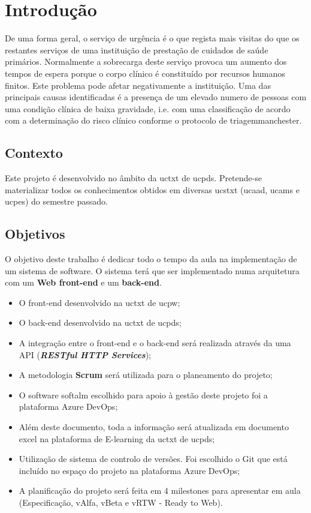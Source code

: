 
\chapter{Introdução}
De uma forma geral, o serviço de urgência é o que regista mais visitas do que os restantes serviços de uma instituição de prestação de cuidados de saúde primários. Normalmente a sobrecarga deste serviço provoca um aumento dos tempos de espera porque o corpo clínico é constituído por recursos humanos finitos. Este problema pode afetar negativamente a instituição. Uma das principais causas identificadas é a presença de um elevado numero de pessoas com uma condição clínica de baixa gravidade, i.e. com uma classificação de acordo com a determinação do risco clínico conforme o protocolo de \gls{triagemmanchester}. \\


\section{Contexto}
Este projeto é desenvolvido no âmbito da \acrshort{uctxt} de \acrshort{ucpds}. Pretende-se materializar todos os conhecimentos obtidos em diversas \acrshort{ucstxt} (\acrshort{ucaad}, \acrshort{ucams} e \acrshort{ucpes}) do semestre passado. 




\section{Objetivos}
O objetivo deste trabalho é dedicar todo o tempo da aula na implementação de um sistema de software. O sistema terá que ser implementado numa arquitetura com um \textbf{Web front-end} e um \textbf{back-end}. \\

\begin{itemize}
	\item O front-end desenvolvido na \acrshort{uctxt} de \acrlong{ucpw};
	\item O back-end desenvolvido na \acrshort{uctxt} de \acrlong{ucpds};
	\item A integração entre o front-end e o back-end será realizada através da uma API (\textit{\textbf{RESTful HTTP Services}});
	\item A metodologia \textbf{Scrum} será utilizada para o planeamento do projeto;
	\item O software \acrshort{softalm} escolhido para apoio à gestão deste projeto foi a plataforma Azure DevOps;
	\item Além deste documento, toda a informação será atualizada em documento excel na plataforma de E-learning da \acrshort{uctxt} de \acrlong{ucpds};
	\item Utilização de sistema de controlo de versões. Foi escolhido o Git que está incluído no espaço do projeto na plataforma Azure DevOps;
	\item A planificação do projeto será feita em 4 milestones para apresentar em aula (Especificação, vAlfa, vBeta e vRTW - Ready to Web).
\end{itemize}



